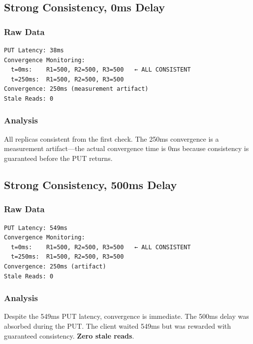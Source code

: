 \documentclass[10pt,a4paper]{article}
\begin{document}
\subsection{Strong Consistency, 0ms Delay}

\subsubsection{Raw Data}
\begin{verbatim}
PUT Latency: 38ms
Convergence Monitoring:
  t=0ms:    R1=500, R2=500, R3=500   ← ALL CONSISTENT
  t=250ms:  R1=500, R2=500, R3=500
Convergence: 250ms (measurement artifact)
Stale Reads: 0
\end{verbatim}

\subsubsection{Analysis}

All replicas consistent from the first check. The 250ms convergence is a measurement artifact---the actual convergence time is 0ms because consistency is guaranteed before the PUT returns.

\subsection{Strong Consistency, 500ms Delay}

\subsubsection{Raw Data}
\begin{verbatim}
PUT Latency: 549ms
Convergence Monitoring:
  t=0ms:    R1=500, R2=500, R3=500   ← ALL CONSISTENT
  t=250ms:  R1=500, R2=500, R3=500
Convergence: 250ms (artifact)
Stale Reads: 0
\end{verbatim}

\subsubsection{Analysis}

Despite the 549ms PUT latency, convergence is immediate. The 500ms delay was absorbed during the PUT. The client waited 549ms but was rewarded with guaranteed consistency. \textbf{Zero stale reads}.
\end{document}
